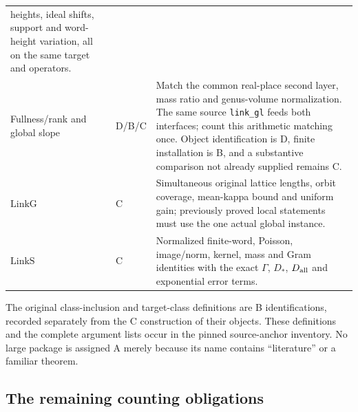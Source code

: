 \begin{center}
\begin{longtable}{p{.22\linewidth}p{.08\linewidth}p{.59\linewidth}}
heights, ideal shifts, support and word-height variation, all on the
same target and operators.\\
Fullness/rank and global slope&D/B/C&Match the common real-place second
layer, mass ratio and genus-volume normalization.  The same source
\texttt{link\_gl} feeds both interfaces; count this arithmetic
matching once.  Object identification is D, finite installation is B,
and a substantive comparison not already supplied remains C.\\
$\mathrm{LinkG}$&C&Simultaneous original lattice lengths, orbit coverage,
mean-kappa bound and uniform gain; previously proved local statements
must use the one actual global instance.\\
$\mathrm{LinkS}$&C&Normalized finite-word, Poisson, image/norm, kernel,
mass and Gram identities with the exact $\Gamma$, $D_*$, $D_{\rm all}$
and exponential error terms.\\
\end{longtable}
\end{center}

The original class-inclusion and target-class definitions are B
identifications, recorded separately from the C construction of their
objects.  These definitions and the complete argument lists occur in
the pinned source-anchor inventory.  No large package is assigned A
merely because its name contains ``literature'' or a familiar theorem.

\subsection{The remaining counting obligations}

